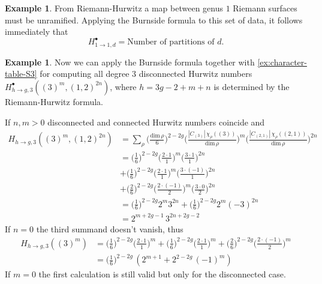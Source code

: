 \documentclass[12pt,a4paper,openright,twoside]{report}
\theoremstyle{definition} %
\newtheorem{example}[theorem]{Example}
\begin{document}
\begin{example}
From Riemann-Hurwitz a map between genus \(1\) Riemann surfaces must be unramified. Applying the Burnside formula to this set of data, it follows immediately that
\[
H^{\bullet}_{1 \to 1, d} = \text{Number of partitions of \(d\)}.
\]
\end{example}

\begin{example}\label{ex:degree-3-Hurwitz-numbers}
    Now we can apply the Burnside formula together with \ref{ex:character-table-S3} for computing all degree \(3\) disconnected Hurwitz numbers \(H^{\bullet}_{h \to g,3}((3)^m, (1,2)^{2n})\), where \(h = 3g - 2 + m + n\) is determined by the Riemann-Hurwitz formula.
    
    If \(n,m > 0\) disconnected and connected Hurwitz numbers coincide and
    \begin{align*}
    H_{h \to g,3}((3)^m, (1,2)^{2n})  &=
    \sum_{\rho} \biggl(\frac{\text{dim}\, \rho}{6}\biggr)^{2-2g}
    \biggl(\frac{|C_{(3)}| \, \chi_{\rho}((3))}{\text{dim}\,\rho}\biggr)^m
    \biggl(\frac{|C_{(2,1)}| \, \chi_{\rho}((2,1))}{\text{dim}\,\rho}\biggr)^{2n} \\
    &= \biggl(\frac{1}{6}\biggr)^{2-2g}
    \biggl(\frac{2 \cdot 1}{1}\biggr)^m
    \biggl(\frac{3 \cdot 1}{1}\biggr)^{2n} \\
    & + \biggl(\frac{1}{6}\biggr)^{2-2g}
    \biggl(\frac{2 \cdot 1}{1}\biggr)^m
    \biggl(\frac{3 \cdot (-1)}{1}\biggr)^{2n} \\
    & + \biggl(\frac{2}{6}\biggr)^{2-2g}
    \biggl(\frac{2 \cdot (-1)}{2}\biggr)^m
    \biggl(\frac{3 \cdot 0}{2}\biggr)^{2n} \\
    &= \biggl(\frac{1}{6}\biggr)^{2-2g} 2^m 3^{2n} + \biggl(\frac{1}{6}\biggr)^{2-2g} 2^m (-3)^{2n}\\
    &= 2^{m+2g-1}\,3^{2n+2g-2}
    \end{align*}
    If \(n = 0\) the third summand doesn't vanish, thus
    \begin{align*}
    H_{h \to g,3}((3)^m)  &= \biggl(\frac{1}{6}\biggr)^{2-2g}
    \biggl(\frac{2 \cdot 1}{1}\biggr)^m 
    + \biggl(\frac{1}{6}\biggr)^{2-2g}
    \biggl(\frac{2 \cdot 1}{1}\biggr)^m 
    + \biggl(\frac{2}{6}\biggr)^{2-2g}
    \biggl(\frac{2 \cdot (-1)}{2}\biggr)^m \\
    &= \biggl(\frac{1}{6}\biggr)^{2-2g}\, (2^{m+1} + 2^{2-2g}\, (-1)^m)
    \end{align*}
    If \(m=0\) the first calculation is still valid but only for the disconnected case.
\end{example}
\end{document}
